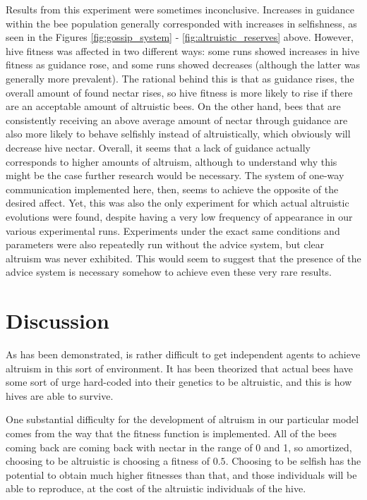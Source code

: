 \documentclass[11pt, letter]{article}
\begin{document}
            Results from this experiment were sometimes inconclusive. Increases in guidance within the bee population generally corresponded with increases in selfishness, as seen in the Figures \ref{fig:gossip_system} - \ref{fig:altruistic_reserves} above.  However, hive fitness was affected in two different ways: some runs showed increases in hive fitness as guidance rose, and some runs showed decreases (although the latter was generally more prevalent). The rational behind this is that as guidance rises, the overall amount of found nectar rises, so hive fitness is more likely to rise if there are an acceptable amount of altruistic bees. On the other hand, bees that are consistently receiving an above average amount of nectar through guidance are also more likely to behave selfishly instead of altruistically, which obviously will decrease hive nectar. Overall, it seems that a lack of guidance actually corresponds to higher amounts of altruism, although to understand why this might be the case further research would be necessary. The system of one-way communication implemented here, then, seems to achieve the opposite of the desired affect. Yet, this was also the only experiment for which actual altruistic evolutions were found, despite having a very low frequency of appearance in our various experimental runs. Experiments under the exact same conditions and parameters were also repeatedly run without the advice system, but clear altruism was never exhibited. This would seem to suggest that the presence of the advice system is necessary somehow to achieve even these very rare results.


	\section{Discussion} %
	\label{sec:discussion}

		As has been demonstrated, is rather difficult to get independent agents to achieve altruism in this sort of environment. It has been theorized that actual bees have some sort of urge hard-coded into their genetics to be altruistic, and this is how hives are able to survive. \cite{macy}

		One substantial difficulty for the development of altruism in our particular model comes from the way that the fitness function is implemented. All of the bees coming back are coming back with nectar in the range of 0 and 1, so amortized, choosing to be altruistic is choosing a fitness of $0.5$. Choosing to be selfish has the potential to obtain much higher fitnesses than that, and those individuals will be able to reproduce, at the cost of the altruistic individuals of the hive.
\end{document}
